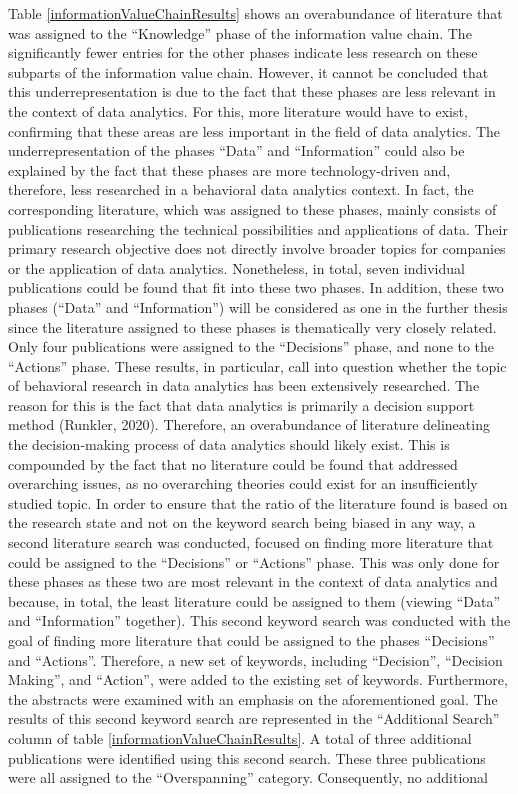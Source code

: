 Table \ref{informationValueChainResults} shows an overabundance of literature that was assigned to the \enquote{Knowledge} phase of the information value chain. The significantly fewer entries for the other phases indicate less research on these subparts of the information value chain. However, it cannot be concluded that this underrepresentation is due to the fact that these phases are less relevant in the context of data analytics. For this, more literature would have to exist, confirming that these areas are less important in the field of data analytics. The underrepresentation of the phases \enquote{Data} and \enquote{Information} could also be explained by the fact that these phases are more technology-driven and, therefore, less researched in a behavioral data analytics context. In fact, the corresponding literature, which was assigned to these phases, mainly consists of publications researching the technical possibilities and applications of data. Their primary research objective does not directly involve broader topics for companies or the application of data analytics. Nonetheless, in total, seven individual publications could be found that fit into these two phases. In addition, these two phases (\enquote{Data} and \enquote{Information}) will be considered as one in the further thesis since the literature assigned to these phases is thematically very closely related. Only four publications were assigned to the \enquote{Decisions} phase, and none to the \enquote{Actions} phase. These results, in particular, call into question whether the topic of behavioral research in data analytics has been extensively researched. The reason for this is the fact that data analytics is primarily a decision support method (Runkler, 2020). Therefore, an overabundance of literature delineating the decision-making process of data analytics should likely exist. This is compounded by the fact that no literature could be found that addressed overarching issues, as no overarching theories could exist for an insufficiently studied topic. In order to ensure that the ratio of the literature found is based on the research state and not on the keyword search being biased in any way, a second literature search was conducted, focused on finding more literature that could be assigned to the \enquote{Decisions} or \enquote{Actions} phase. This was only done for these phases as these two are most relevant in the context of data analytics and because, in total, the least literature could be assigned to them (viewing \enquote{Data} and \enquote{Information} together). This second keyword search was conducted with the goal of finding more literature that could be assigned to the phases \enquote{Decisions} and \enquote{Actions}. Therefore, a new set of keywords, including \enquote{Decision}, \enquote{Decision Making}, and \enquote{Action}, were added to the existing set of keywords. Furthermore, the abstracts were examined with an emphasis on the aforementioned goal. The results of this second keyword search are represented in the \enquote{Additional Search} column of table \ref{informationValueChainResults}. A total of three additional publications were identified using this second search. These three publications were all assigned to the \enquote{Overspanning} category. Consequently, no additional 